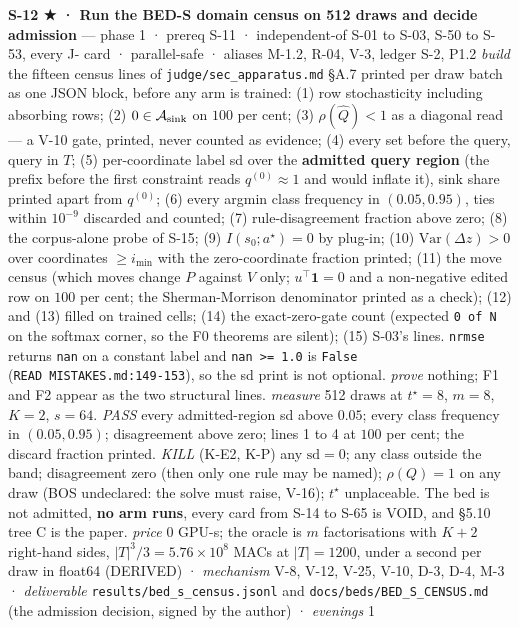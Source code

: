\documentclass[11pt,a4paper]{article}
\theoremstyle{plain}
\theoremstyle{definition}
\theoremstyle{remark}
\begin{document}
\textbf{S-12 ★ · Run the BED-S domain census on 512 draws and decide
admission} --- phase 1 · prereq S-11 · independent-of S-01 to S-03, S-50
to S-53, every J- card · parallel-safe · aliases M-1.2, R-04, V-3,
ledger S-2, P1.2 \emph{build} the fifteen census lines of
\texttt{judge/sec\_apparatus.md} §A.7 printed per draw batch as one JSON
block, before any arm is trained: (1) row stochasticity including
absorbing rows; (2) \(0\in\mathcal{A}_{\rm sink}\) on \(100\) per cent;
(3) \(\rho(\hat Q)<1\) as a diagonal read --- a V-10 gate, printed,
never counted as evidence; (4) every set before the query, query in
\(T\); (5) per-coordinate label sd over the \textbf{admitted query
region} (the prefix before the first constraint reads
\(q^{(0)}\approx1\) and would inflate it), sink share printed apart from
\(q^{(0)}\); (6) every argmin class frequency in \((0.05,0.95)\), ties
within \(10^{-9}\) discarded and counted; (7) rule-disagreement fraction
above zero; (8) the corpus-alone probe of S-15; (9) \(I(s_0;a^\star)=0\)
by plug-in; (10) \(\mathrm{Var}(\Delta z)>0\) over coordinates
\(\ge i_{\min}\) with the zero-coordinate fraction printed; (11) the
move census (which moves change \(P\) against \(V\) only;
\(u^\top\mathbf 1=0\) and a non-negative edited row on \(100\) per cent;
the Sherman-Morrison denominator printed as a check); (12) and (13)
filled on trained cells; (14) the exact-zero-gate count (expected
\texttt{0\ of\ N} on the softmax corner, so the F0 theorems are silent);
(15) S-03's lines. \texttt{nrmse} returns \texttt{nan} on a constant
label and \texttt{nan\ \textgreater{}=\ 1.0} is \texttt{False}
(\texttt{READ\ MISTAKES.md:149-153}), so the sd print is not optional.
\emph{prove} nothing; F1 and F2 appear as the two structural lines.
\emph{measure} 512 draws at \(t^\star=8\), \(m=8\), \(K=2\), \(s=64\).
\emph{PASS} every admitted-region sd above \(0.05\); every class
frequency in \((0.05,0.95)\); disagreement above zero; lines 1 to 4 at
\(100\) per cent; the discard fraction printed. \emph{KILL} (K-E2, K-P)
any \(\mathrm{sd}=0\); any class outside the band; disagreement zero
(then only one rule may be named); \(\rho(Q)=1\) on any draw (BOS
undeclared: the solve must raise, V-16); \(t^\star\) unplaceable. The
bed is not admitted, \textbf{no arm runs}, every card from S-14 to S-65
is VOID, and §5.10 tree C is the paper. \emph{price} \(0\) GPU-s; the
oracle is \(m\) factorisations with \(K+2\) right-hand sides,
\(|T|^3/3=5.76\times10^{8}\) MACs at \(|T|=1200\), under a second per
draw in float64 (DERIVED) · \emph{mechanism} V-8, V-12, V-25, V-10, D-3,
D-4, M-3 · \emph{deliverable} \texttt{results/bed\_s\_census.jsonl} and
\texttt{docs/beds/BED\_S\_CENSUS.md} (the admission decision, signed by
the author) · \emph{evenings} 1
\end{document}
